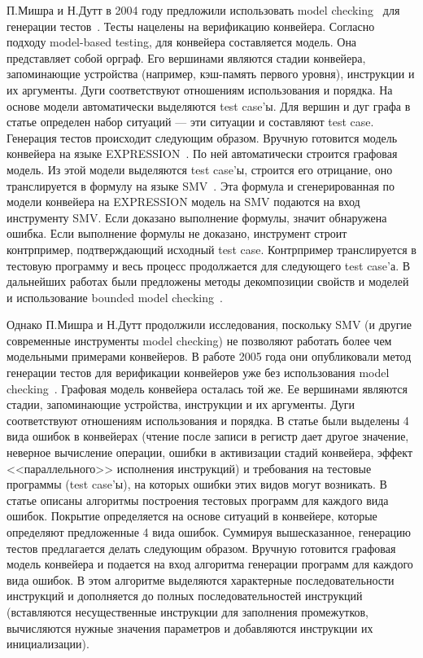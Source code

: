 \documentclass[14pt]{extreport}
\begin{document}
П.Мишра и Н.Дутт в 2004 году предложили использовать model checking~\cite{ModelChecking} для генерации тестов~\cite{MishraDutt04}. Тесты нацелены на верификацию конвейера. Согласно подходу model-based testing, для конвейера составляется модель. Она представляет собой орграф. Его вершинами являются стадии конвейера, запоминающие устройства (например, кэш-память первого уровня), инструкции и их аргументы. Дуги соответствуют отношениям использования и порядка. На основе модели автоматически выделяются test case'ы. Для вершин и дуг графа в статье определен набор ситуаций --- эти ситуации и составляют test case. Генерация тестов происходит следующим образом. Вручную готовится модель конвейера на языке EXPRESSION~\cite{EXPRESSION}. По ней автоматически строится графовая модель. Из этой модели выделяются test case'ы, строится его отрицание, оно транслируется в формулу на языке SMV~\cite{SMV}. Эта формула и сгенерированная по модели конвейера на EXPRESSION модель на SMV подаются на вход инструменту SMV. Если доказано выполнение формулы, значит обнаружена ошибка. Если выполнение формулы не доказано, инструмент строит контрпример, подтверждающий исходный test case. Контрпример транслируется в тестовую программу и весь процесс продолжается для следующего test case'а. В дальнейших работах были предложены методы декомпозиции свойств и моделей и использование bounded model checking~\cite{Mishra09}.

Однако П.Мишра и Н.Дутт продолжили исследования, поскольку SMV (и другие современные инструменты model checking) не позволяют работать более чем модельными примерами конвейеров. В работе 2005 года они опубликовали метод генерации тестов для верификации конвейеров уже без использования model checking~\cite{MishraDutt05}. Графовая модель конвейера осталась той же. Ее вершинами являются стадии, запоминающие устройства, инструкции и их аргументы. Дуги соответствуют отношениям использования и порядка. В статье были выделены 4 вида ошибок в конвейерах (чтение после записи в регистр дает другое значение, неверное вычисление операции, ошибки в активизации стадий конвейера, эффект <<параллельного>> исполнения инструкций) и требования на тестовые программы (test case'ы), на которых ошибки этих видов могут возникать. В статье описаны алгоритмы построения тестовых программ для каждого вида ошибок. Покрытие определяется на основе ситуаций в конвейере, которые определяют предложенные 4 вида ошибок. Суммируя вышесказанное, генерацию тестов предлагается делать следующим образом. Вручную готовится графовая модель конвейера и подается на вход алгоритма генерации программ для каждого вида ошибок. В этом алгоритме выделяются характерные последовательности инструкций и  дополняется до полных последовательностей инструкций (вставляются несущественные инструкции для заполнения промежутков, вычисляются нужные значения параметров и добавляются инструкции их инициализации).
\end{document}
